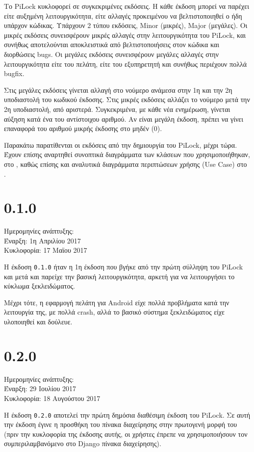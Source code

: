 Το PiLock κυκλοφορεί σε συγκεκριμένες εκδόσεις. Η κάθε έκδοση μπορεί να παρέχει είτε αυξημένη λειτουργικότητα, είτε αλλαγές προκειμένου να βελτιστοποιηθεί ο ήδη υπάρχον κώδικας. Υπάρχουν 2 τύπου εκδόσεις, Minor (μικρές), Major (μεγάλες). Οι μικρές εκδόσεις συνεισφέρουν μικρές αλλαγές στην λειτουργικότητα του PiLock, και συνήθως αποτελούνται αποκλειστικά από βελτιστοποιήσεις στον κώδικα και διορθώσεις bugs. Οι μεγάλες εκδόσεις συνεισφέρουν μεγάλες αλλαγές στην λειτουργικότητα είτε του πελάτη, είτε του εξυπηρετητή και συνήθως περιέχουν πολλά bugfix.

Στις μεγάλες εκδόσεις γίνεται αλλαγή στο νούμερο ανάμεσα στην 1η και την 2η υποδιαστολή του κωδικού έκδοσης. Στις μικρές εκδόσεις αλλάζει το νούμερο μετά την 2η υποδιαστολή, από αριστερά. Συγκεκριμένα, με κάθε νέα ενημέρωση, γίνεται αύξηση κατά ένα του αντίστοιχου αριθμού. Αν είναι μεγάλη έκδοση, πρέπει να γίνει επαναφορά του αριθμού μικρής έκδοσης στο μηδέν (0).

Παρακάτω παρατίθενται οι εκδόσεις από την δημιουργία του PiLock, μέχρι τώρα. Έχουν επίσης αναρτηθεί συνοπτικά διαγράμματα των κλάσεων που χρησιμοποιήθηκαν, στο , καθώς επίσης και αναλυτικά διαγράμματα περιπτώσεων χρήσης (Use Case) στο .

\section{0.1.0}
	Ημερομηνίες ανάπτυξης:\\Έναρξη: 1η Απριλίου 2017\\Κυκλοφορία: 17 Μαϊου 2017

	Η έκδοση \verb|0.1.0| ήταν η 1η έκδοση που βγήκε από την πρώτη σύλληψη του PiLock και μετά και παρείχε την βασική λειτουργικότητα, αρκετή για να λειτουργήσει το κύκλωμα ξεκλειδώματος. 

	Μέχρι τότε, η εφαρμογή πελάτη για Android είχε πολλά προβλήματα κατά την λειτουργία της, με πολλά crash, αλλά το βασικό σύστημα ξεκλειδώματος είχε υλοποιηθεί και δούλευε.

\section{0.2.0}
	Ημερομηνίες ανάπτυξης:\\Έναρξη: 29 Ιουλίου 2017\\Κυκλοφορία: 18 Αυγούστου 2017

	Η έκδοση \verb|0.2.0| αποτελεί την πρώτη δημόσια διαθέσιμη έκδοση του PiLock. Σε αυτή την έκδοση έγινε η προσθήκη του πίνακα διαχείρησης στην πρωτογενή μορφή του (πριν την κυκλοφορία της έκδοσης αυτής, οι χρήστες έπρεπε να χρησιμοποιήσουν τον συμπεριλαμβανόμενο στο Django πίνακα διαχείρησης).

